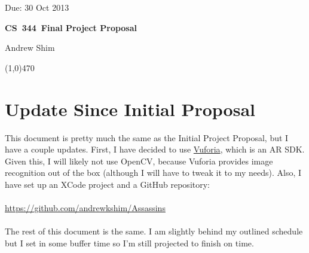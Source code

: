 \documentclass{article}
\newcommand\textline[4][t]{%
  \par\smallskip\noindent\parbox[#1]{.200\textwidth}{\raggedright#2}%
  \parbox[#1]{.600\textwidth}{\centering\Large\textbf{#3}}%
  \parbox[#1]{.200\textwidth}{\raggedleft#4}\par\smallskip%
  \line(1,0){470}
}
\newcommand{\hmwkTitle}{Final Project Proposal} %
\newcommand{\hmwkClass}{CS\ 344} %
\newcommand{\hmwkAuthorName}{Andrew Shim} %
\newcommand{\dueDate}{30 Oct 2013}
\begin{document}
\thispagestyle{empty}


\textline[t]{Due: \dueDate}{\hmwkClass\ \hmwkTitle}{\hmwkAuthorName}


\section{Update Since Initial Proposal}
This document is pretty much the same as the Initial Project Proposal, but I 
have a couple updates. First, I have decided to use \href{https://www.vuforia.com/}{Vuforia},
which is an AR SDK. Given this, I will likely not use OpenCV, because
Vuforia provides image recognition out of the box (although I will have to
tweak it to my needs). Also, I have set up an
XCode project and a GitHub repository: \\\\
\url{https://github.com/andrewkshim/Assassins}
\\\\
The rest of this document is the same. I am slightly behind my outlined
schedule but I set in some buffer time so I'm still projected to 
finish on time.
\end{document}
